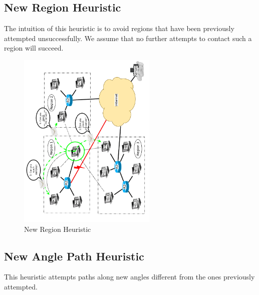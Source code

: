 \documentclass[conference]{IEEEtran}
\begin{document}
%

\subsection{New Region Heuristic}
The intuition of this heuristic is to avoid regions that have been previously attempted unsuccessfully.  We assume that no further attempts to contact such a region will succeed.
\begin{algorithm}
\DontPrintSemicolon
{}
\SetAlgoLined
\SetAlgoLongEnd
\scriptsize
{}
\caption{}
\small
\end{algorithm}

\begin{figure}
\centering
\includegraphics[width=2.6in,angle=-90]{../../images/diagrams/new_region_all}
\caption{New Region Heuristic}
\end{figure}

%
\subsection{New Angle Path Heuristic}
This heuristic attempts paths along new angles different from the ones previously attempted.
\begin{algorithm}
\DontPrintSemicolon
{}
\SetAlgoLined
\SetAlgoLongEnd
\scriptsize
{}
\caption{}
\small
\end{algorithm}
\end{document}
